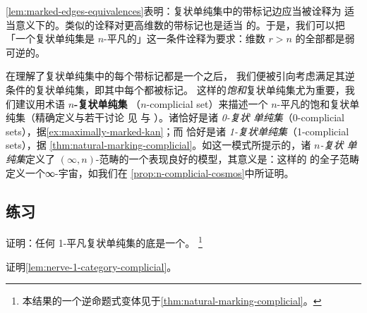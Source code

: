 \begin{digression}\label{dig:saturation-higher-simplices}
\cref{lem:marked-edges-equivalences}表明：复状单纯集中的带标记边应当被诠释为
适当意义下的\trEquivalence。类似的诠释对更高维数的带标记\trSimplex{}也是适当
的。于是，我们可以把「一个复状单纯集是 $n$-平凡的」这一条件诠释为要求：维数
$r>n$ 的全部\trSimplex{}都是弱可逆的。

在理解了复状单纯集中的每个带标记\trSimplex{}都是一个\trEquivalence{}之后，
我们便被引向考虑满足其逆条件的复状单纯集，即其中每个\trEquivalence{}都被标记。
这样的\emph{饱和}复状单纯集尤为重要，我们建议用术语 \textbf{$n$-复状单纯集}
（$n$-complicial set）来描述一个 $n$-平凡的饱和复状单纯集（精确定义与若干讨论
见 \cite{bib105} 与 \cite{bib89}）。诸\trKanComplex{}恰好是诸 \emph{0-复状
单纯集}（0-complicial sets），据\cref{ex:maximally-marked-kan}；而%
\trQuasiCategory{}恰好是诸 \emph{1-复状单纯集}（1-complicial sets），据
\cref{thm:natural-marking-complicial}。如这一模式所提示的，诸 \emph{$n$-复状
单纯集}定义了 $(\infty,n)$-范畴的一个表现良好的模型，其意义是：这样的%
\trSimplicialSet{}的全子范畴定义一个\trCartesianClosed{}∞-宇宙，如我们在
\cref{prop:n-complicial-cosmos}中所证明。%
\end{digression}

\subsection*{练习}

\begin{exercise}\label{ex:underlying-1-trivial-quasi-category}
证明：任何 1-平凡复状单纯集的底\trSimplicialSet{}是一个\trQuasiCategory。
\footnote{本结果的一个逆命题式变体见于\cref{thm:natural-marking-complicial}。}
\end{exercise}

\begin{exercise}\label{ex:prove-lem-nerve-1-category}
证明\cref{lem:nerve-1-category-complicial}。
\end{exercise}

